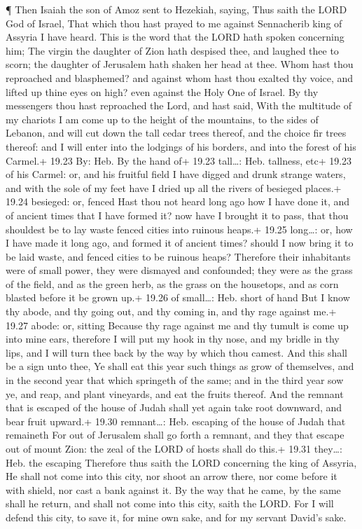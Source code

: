  ¶ Then Isaiah the son of Amoz sent to Hezekiah, saying,
Thus saith the LORD God of Israel, That which thou hast prayed to me
against Sennacherib king of Assyria I have heard.  This is
the word that the LORD hath spoken concerning him; The virgin the
daughter of Zion hath despised thee, and laughed thee to scorn; the
daughter of Jerusalem hath shaken her head at thee.  Whom
hast thou reproached and blasphemed? and against whom hast thou exalted
thy voice, and lifted up thine eyes on high? even against the Holy One
of Israel.  By thy messengers thou hast reproached the
Lord, and hast said, With the multitude of my chariots I am come up to
the height of the mountains, to the sides of Lebanon, and will cut down
the tall cedar trees thereof, and the choice fir trees thereof: and I
will enter into the lodgings of his borders, and into the forest of his
Carmel.+ 19.23 By: Heb. By the hand of+ 19.23 tall\ldots: Heb. tallness,
etc+ 19.23 of his Carmel: or, and his fruitful field  I
have digged and drunk strange waters, and with the sole of my feet have
I dried up all the rivers of besieged places.+ 19.24 besieged: or,
fenced  Hast thou not heard long ago how I have done it,
and of ancient times that I have formed it? now have I brought it to
pass, that thou shouldest be to lay waste fenced cities into ruinous
heaps.+ 19.25 long\ldots: or, how I have made it long ago, and formed it
of ancient times? should I now bring it to be laid waste, and fenced
cities to be ruinous heaps?  Therefore their inhabitants
were of small power, they were dismayed and confounded; they were as the
grass of the field, and as the green herb, as the grass on the
housetops, and as corn blasted before it be grown up.+ 19.26 of
small\ldots: Heb. short of hand  But I know thy abode, and
thy going out, and thy coming in, and thy rage against me.+ 19.27 abode:
or, sitting  Because thy rage against me and thy tumult is
come up into mine ears, therefore I will put my hook in thy nose, and my
bridle in thy lips, and I will turn thee back by the way by which thou
camest.  And this shall be a sign unto thee, Ye shall eat
this year such things as grow of themselves, and in the second year that
which springeth of the same; and in the third year sow ye, and reap, and
plant vineyards, and eat the fruits thereof.  And the
remnant that is escaped of the house of Judah shall yet again take root
downward, and bear fruit upward.+ 19.30 remnant\ldots: Heb. escaping of
the house of Judah that remaineth  For out of Jerusalem
shall go forth a remnant, and they that escape out of mount Zion: the
zeal of the LORD of hosts shall do this.+ 19.31 they\ldots: Heb. the
escaping  Therefore thus saith the LORD concerning the king
of Assyria, He shall not come into this city, nor shoot an arrow there,
nor come before it with shield, nor cast a bank against it.
 By the way that he came, by the same shall he return, and
shall not come into this city, saith the LORD.  For I will
defend this city, to save it, for mine own sake, and for my servant
David's sake.

